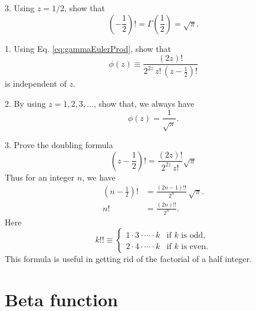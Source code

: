 \documentclass{book}
\begin{document}
3. Using $z = 1/2$, show that
\begin{equation}
  \left( -\frac 1 2 \right)!
=
  \Gamma\left( \frac 1 2 \right)
=
  \sqrt \pi.
  \label{eq:gammahalf}
\end{equation}






1. Using Eq. \eqref{eq:gammaEulerProd},
show that\cite{whittaker}
\[
  \phi(z)
\equiv
  \frac{
    \left( 2z \right)!
  }
  {
    2^{2z} \, z! \, \left( z - \frac 1 2 \right)!
  }
\]
is independent of $z$.


2. By using $z = 1, 2, 3, \dots$, show that, we always have
\[
  \phi(z) = \frac 1 {\sqrt \pi}.
\]

3. Prove the doubling formula\cite{whittaker}
\begin{equation}
  \left( z - \frac 1 2 \right)!
=
  \frac{ (2z)! }
  { 2^{2z} \, z! }
  \sqrt \pi
  \label{eq:doubling}
\end{equation}
Thus for an integer $n$,
we have
\begin{align}
  \left(n - \frac 1 2 \right)!
&=
  \frac{ (2 n - 1)!! }
  { 2^n } \,
  \sqrt \pi.
  \label{eq:doubling_odd}
\\
  n!
&=
  \frac{ (2 n)!! }
  { 2^n }.
  \label{eq:doubling_even}
\end{align}
Here
\begin{equation}
  k!!
\equiv
\begin{cases}
  1 \cdot 3 \cdot \cdots \cdot k  & \mbox{if $k$ is odd,} \\
  2 \cdot 4 \cdot \cdots \cdot k  & \mbox{if $k$ is even.}
\end{cases}
\end{equation}
This formula is useful in getting rid of the factorial of a half integer.




\section{Beta function}



\end{document}
